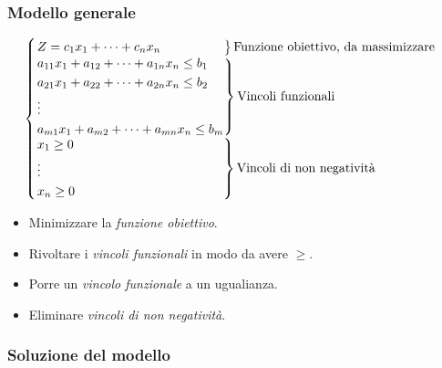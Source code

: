 \documentclass{article}
\begin{document}
\subsubsection{Modello generale}
$$
  \begin{cases}
    \begin{rcases}
      Z = c_1x_1 + \dots + c_nx_n \hspace{1.75cm}
    \end{rcases} \text{Funzione obiettivo, da massimizzare} \\
    \begin{rcases}
      a_{11}x_1 + a_{12}+\dots + a_{1n}x_n \le b_1 \\
      a_{21}x_1 + a_{22}+\dots + a_{2n}x_n \le b_2 \\
      \vdots                                       \\
      a_{m1}x_1 + a_{m2}+\dots + a_{mn}x_n \le b_m \\
    \end{rcases} \text{Vincoli funzionali}            \\
    \begin{rcases}
      x_1\ge0 \\
      \vdots  \\
      x_n \ge 0 \hspace{4.10cm}
    \end{rcases} \text{Vincoli di non negatività}
  \end{cases}
$$

\begin{tcolorbox}[
    colback=lightgray,
    colframe=black,
    coltext=black,
    title=Versioni alternative,
    colbacktitle=black,
    coltitle=lightgray,
    breakable
  ]
  \begin{itemize}
    \item Minimizzare la \textit{funzione obiettivo}.
    \item Rivoltare i \textit{vincoli funzionali} in modo da avere $\ge$.
    \item Porre un \textit{vincolo funzionale} a un ugualianza.
    \item Eliminare \textit{vincoli di non negatività}.
  \end{itemize}
\end{tcolorbox}

\subsubsection{Soluzione del modello}
\end{document}
